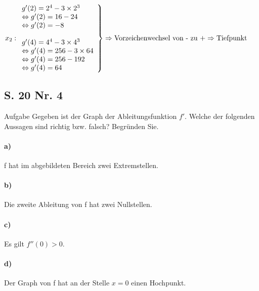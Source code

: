 \documentclass[arbeitsmappe.tex]{subfiles}
\begin{document}
    $\left.
    x_2:
    \begin{array}{ll}
        g'(2) = 2^4 - 3\times 2^3                 \\
        \Leftrightarrow g'(2) = 16 - 24           \\
        \Leftrightarrow g'(2) = -8                \\
        \\
        g'(4) = 4^4 - 3\times 4^3 \\
        \Leftrightarrow g'(4) = 256 - 3 \times 64 \\
        \Leftrightarrow g'(4) = 256 - 192 \\
        \Leftrightarrow g'(4) = 64 \\
    \end{array}
    \right\} \Rightarrow \text{Vorzeichenwechsel von - zu +} \Rightarrow \text{Tiefpunkt} \\
    $
    \newpage

    \subsection{S. 20 Nr. 4}

    \begin{rblock}{Aufgabe}
        Gegeben ist der Graph der Ableitungsfunktion $f'$.
        Welche der folgenden Aussagen sind richtig bzw. falsch? Begründen Sie.

        \paragraph{a)} f hat im abgebildeten Bereich zwei Extremstellen.

        \paragraph{b)} Die zweite Ableitung von f hat zwei Nullstellen.

        \paragraph{c)} Es gilt $f''(0) > 0$.

        \paragraph{d)} Der Graph von f hat an der Stelle $x = 0$ einen Hochpunkt.
    \end{rblock}
\end{document}

